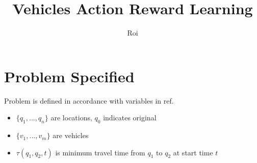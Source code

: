\documentclass{article}
\title{Vehicles Action Reward Learning}
\author{Roi}
\begin{document}
\maketitle{}

\section{Problem Specified}
Problem is defined in accordance with variables in ref.\cite{r1}
\begin{itemize}
    \item $\{q_1,...,q_n\}$ are locations, $q_0$ indicates original
    \item $\{v_1,...,v_m\}$ are vehicles
    \item $\tau\left(q_1, q_2, t\right)$ is minimum travel time from $q_1$ to $q_2$ at start time $t$
\end{itemize}
\end{document}
